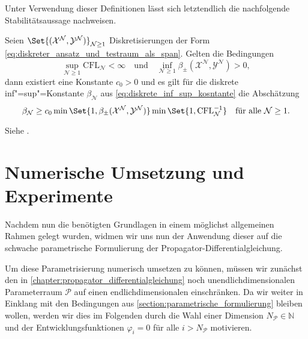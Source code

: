 \documentclass[../main.tex]{subfiles}
\begin{document}
Unter Verwendung dieser Definitionen lässt sich letztendlich die nachfolgende Stabilitätsaussage nachweisen.

\begin{Satz}
    Seien $\Set{(\mathcal X^{\mathcal N}, \mathcal Y^{\mathcal N})}_{\mathcal N \geq 1}$ Diskretisierungen der Form \cref{eq:diskreter_ansatz_und_testraum_als_span}.
    Gelten die Bedingungen
    \begin{equation}
        \sup_{\mathcal N \geq 1} \mathrm{CFL}_{\mathcal N} < \infty
        \quad \text{und} \quad
        \inf_{\mathcal N \geq 1} \beta_{\pm}(\mathcal X^{\mathcal N}, \mathcal Y^{\mathcal N}) > 0,
    \end{equation}
    dann existiert eine Konstante $c_{0} > 0$ und es gilt für die diskrete inf"=sup"=Konstante $\beta_{\mathcal N}$ aus \cref{eq:diskrete_inf_sup_kosntante} die Abschätzung
    \begin{equation}
        \beta_{\mathcal N} \geq c_{0} \min\Set{1, \beta_{\pm}(\mathcal X^{\mathcal N}, \mathcal Y^{\mathcal N})} \min\Set{1, \mathrm{CFL}_{\mathcal N}^{-1}} \quad \fa \mathcal N \geq 1.
    \end{equation}

    \begin{Beweis}
        Siehe \cite[Subsection 5.2.2]{Andreev:2012ep}.
    \end{Beweis}
\end{Satz}


\section{Numerische Umsetzung und Experimente} %
\label{section:galerkin_numerische_umsetzung_und_experimente}

Nachdem nun die benötigten Grundlagen in einem möglichst allgemeinen Rahmen gelegt wurden, widmen wir uns nun der Anwendung dieser auf die schwache parametrische Formulierung der Propagator-Differentialgleichung.

Um diese Parametrisierung numerisch umsetzen zu können, müssen wir zunächst den in \cref{chapter:propagator_differentialgleichung} noch unendlichdimensionalen Parameterraum $\mathcal P$ auf einen endlichdimensionalen einschränken.
Da wir weiter in Einklang mit den Bedingungen aus \cref{section:parametrische_formulierung} bleiben wollen, werden wir dies im Folgenden durch die Wahl einer Dimension $N_{\mathcal P} \in \mathbb{N}$ und der Entwicklungsfunktionen $\varphi_{i} = 0$ für alle $i > N_{\mathcal P}$ motivieren.
\end{document}
